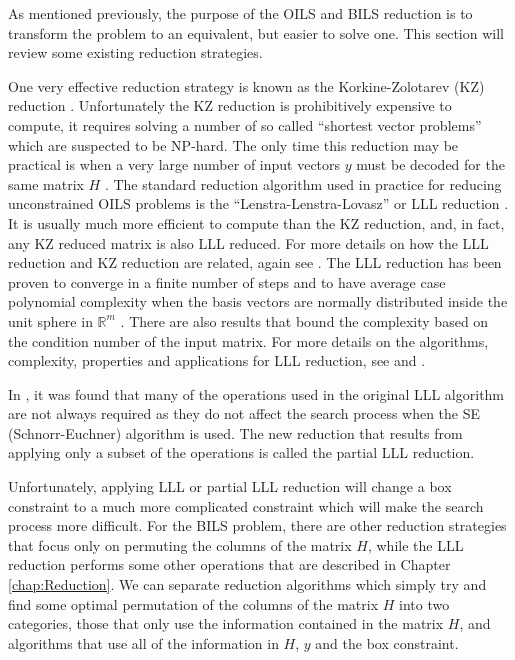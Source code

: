 \documentclass[12pt,Bold,letterpaper]{mcgilletdclass}
\begin{document}
As mentioned previously, the purpose of the OILS and BILS reduction is to transform the problem to an equivalent, but easier to solve one. This section will review some existing reduction strategies.

One very effective reduction strategy is known as the Korkine-Zolotarev (KZ) 
reduction \cite{KorZ73}. Unfortunately the KZ reduction is prohibitively expensive to compute,
it requires solving a number of so called ``shortest vector problems'' which are suspected to be NP-hard. The only time this reduction
may be practical is when a very large number of input vectors $y$ must be
decoded for the same matrix $H$ \cite{AgrEVZ02}. The standard reduction algorithm used in practice for reducing unconstrained OILS problems is the ``Lenstra-Lenstra-Lovasz'' or LLL
reduction \cite{LenLL82}. It is usually much more efficient to compute than the
KZ reduction, and, in fact, any KZ reduced matrix is also LLL reduced. For more details
on how the LLL reduction and KZ reduction are related, again see
\cite{AgrEVZ02}. The LLL reduction has been proven to converge in a finite
number of steps and to have average case polynomial complexity when the basis
vectors are normally distributed inside the unit sphere in $\mathbb{R}^m$ \cite{LinMH10}. There
are also results that bound the complexity based on the condition number of the
input matrix. For more details on the algorithms, complexity, properties and applications for LLL
reduction, see \cite{WubSJM11} and \cite{NguV10}.

In \cite{XieCB11}, it was found that many of the operations used in the original LLL algorithm are not always required as they do not affect the search process when the SE (Schnorr-Euchner) algorithm is used. The new reduction that results from applying only a subset of the operations is called the partial LLL reduction.

Unfortunately, applying LLL or partial LLL reduction will change a box constraint to a much more complicated constraint which will make the search process more difficult. For the BILS problem, there are other reduction strategies that focus only on permuting the columns of the matrix $H$, while the LLL reduction performs some other operations that are described in Chapter \ref{chap:Reduction}. We can separate reduction algorithms which simply try and find some optimal permutation of the columns of the matrix $H$ into two categories, those that only use the information contained in the matrix $H$, and algorithms that use all of the information in $H$, $y$ and the box constraint.
\end{document}
